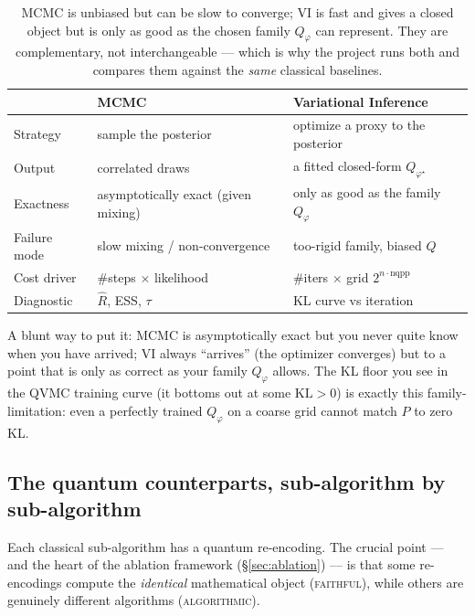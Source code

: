 \documentclass[11pt]{article}
\newcommand{\KL}{\mathrm{KL}}
\newcommand{\Rhat}{\hat{R}}
\newcommand{\faithful}{\textsc{faithful}}
\newcommand{\algorithmic}{\textsc{algorithmic}}
\begin{document}
\begin{table}[h]
\centering\footnotesize
\begin{tabular}{@{}lll@{}}
\toprule
 & \textbf{MCMC} & \textbf{Variational Inference}\\
\midrule
Strategy & sample the posterior & optimize a proxy to the posterior\\
Output & correlated draws & a fitted closed-form $Q_{\varphi^\star}$\\
Exactness & asymptotically exact (given mixing) & only as good as the family $Q_\varphi$\\
Failure mode & slow mixing / non-convergence & too-rigid family, biased $Q$\\
Cost driver & \#steps $\times$ likelihood & \#iters $\times$ grid $2^{n\cdot\mathrm{nqpp}}$\\
Diagnostic & $\Rhat$, ESS, $\tau$ & KL curve vs iteration\\
\bottomrule
\end{tabular}
\caption{MCMC is unbiased but can be slow to converge; VI is fast and gives a
closed object but is only as good as the chosen family $Q_\varphi$ can
represent. They are complementary, not interchangeable --- which is why the
project runs both and compares them against the \emph{same} classical
baselines.}
\end{table}

A blunt way to put it: MCMC is asymptotically exact but you never quite know
when you have arrived; VI always ``arrives'' (the optimizer converges) but to a
point that is only as correct as your family $Q_\varphi$ allows. The KL floor
you see in the QVMC training curve (it bottoms out at some $\KL>0$) is exactly
this family-limitation: even a perfectly trained $Q_\varphi$ on a coarse grid
cannot match $P$ to zero KL.

\subsection{The quantum counterparts, sub-algorithm by sub-algorithm}

Each classical sub-algorithm has a quantum re-encoding. The crucial point ---
and the heart of the ablation framework (\S\ref{sec:ablation}) --- is that some
re-encodings compute the \emph{identical} mathematical object (\faithful), while
others are genuinely different algorithms (\algorithmic).
\end{document}
